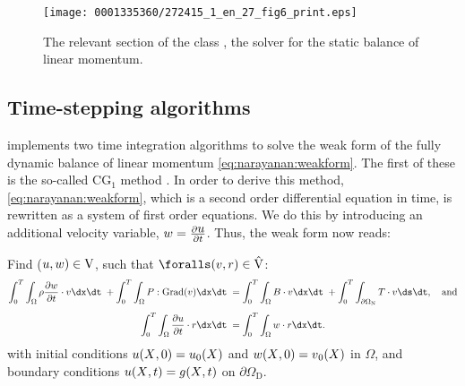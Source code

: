\begin{figure}[!t]
\texttt{[image: 0001335360/272415\_1\_en\_27\_fig6\_print.eps]}
\caption{The relevant section of the class
, the solver for the static balance of
linear momentum.}
\label{code:narayanan:staticmomentumsolver}\vspace*{6pt}
\end{figure}

\subsection{Time-stepping algorithms}

\twist{} implements two time integration algorithms to solve the weak
form of the fully dynamic balance of linear momentum
\eqref{eq:narayanan:weakform}. The first of these is the
so-called CG$_{1}$ method \citep{ErikssonEstepHansboEtAl1996}. In order
to derive this method, \eqref{eq:narayanan:weakform}, which is
a second order differential equation in time, is rewritten as a system
of first order equations. We do this by introducing an additional
velocity variable, $\mbox{$ w$} = \frac{\partial \mbox{$ u$}}{\partial t}$. Thus, the
weak form now reads:

\noindent Find ($\mbox{$ u$}, \mbox{$ w$}) \in \mathrm{V}$, such that $\foralls (\bv,
\br) \in \hat{\mathrm{V}}$:
\begin{equation}
  \begin{split}
    \int_{0}^{T} \int_{\Omega} \rho \frac{\partial \bw}{\partial t}
    \cdot \bv \dx \dt\; + \int_{0}^{T} \int_{\Omega}
    \bP:\mathrm{Grad}(\bv) \dx \dt\;
    &= \int_{0}^{T} \int_{\Omega} \bB \cdot \bv \dx \dt\; +
    \int_{0}^{T} \int_{\partial\Omega_{\mathrm{N}}} \bT \cdot \bv \ds
    \dt, \quad \mathrm{and}\\[4pt]
    \int_{0}^{T} \int_{\Omega} \frac{\partial \bu}{\partial t} \cdot
    \br \dx \dt\;
    &= \int_{0}^{T} \int_{\Omega} \bw \cdot \br \dx \dt.
  \end{split}
\label{eq:narayanan:cg1weakform}
\end{equation}
with initial conditions $\mbox{$ u$}(\mbox{$ X$}, 0) = \mbox{$ u$}_{0}(\mbox{$ X$})$ and $w(\mbox{$ X$}, 0)
= \mbox{$ v$}_{0}(\mbox{$ X$})$ in $\Omega$, and boundary conditions $\mbox{$ u$}(\mbox{$ X$}, t) =
\mbox{$ g$}(\mbox{$ X$}, t)$ on $\partial\Omega_{\mathrm{D}}$.


